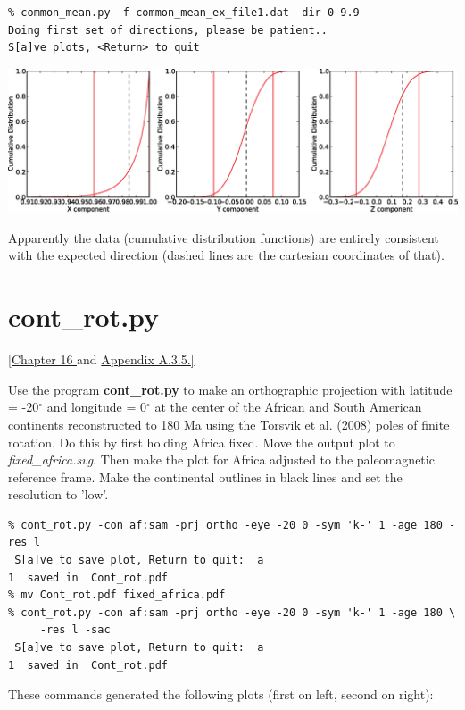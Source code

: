 \documentclass[11pt]{book}
\begin{document}
{{{{{\begin{verbatim}
% common_mean.py -f common_mean_ex_file1.dat -dir 0 9.9
Doing first set of directions, please be patient..
S[a]ve plots, <Return> to quit
\end{verbatim}

{%
  \includegraphics[width=20cm]{EPSfiles/common-mean-EX.eps}}

Apparently the data (cumulative distribution functions) are entirely consistent with the expected direction (dashed lines are the cartesian coordinates of that).   

\section{cont\_rot.py} 
\href{http://Webbookcopy.html#Tectonic_applications_of_paleomagnetism}{[Chapter 16 }and \href{http://Webbookcopy.html#polerot}{Appendix A.3.5.]}

Use the program {\bf cont\_rot.py} to make an orthographic projection with latitude = -20$^{\circ}$ and longitude = 0$^{\circ}$ at the center of the African and South American  continents reconstructed to 180 Ma using the Torsvik et al. (2008) poles of finite rotation.  \nocite{torsvik08} Do this by first holding Africa fixed.  Move the output plot to {\it fixed\_africa.svg}.  Then make the plot for Africa adjusted  to the paleomagnetic reference frame.  Make the continental outlines in black lines and set the resolution to 'low'.  

\begin{verbatim}
% cont_rot.py -con af:sam -prj ortho -eye -20 0 -sym 'k-' 1 -age 180 -res l
 S[a]ve to save plot, Return to quit:  a
1  saved in  Cont_rot.pdf
% mv Cont_rot.pdf fixed_africa.pdf
% cont_rot.py -con af:sam -prj ortho -eye -20 0 -sym 'k-' 1 -age 180 \
     -res l -sac
 S[a]ve to save plot, Return to quit:  a
1  saved in  Cont_rot.pdf
\end{verbatim}

These commands generated the following plots (first on left, second on right):

}}}}}
\end{document}
